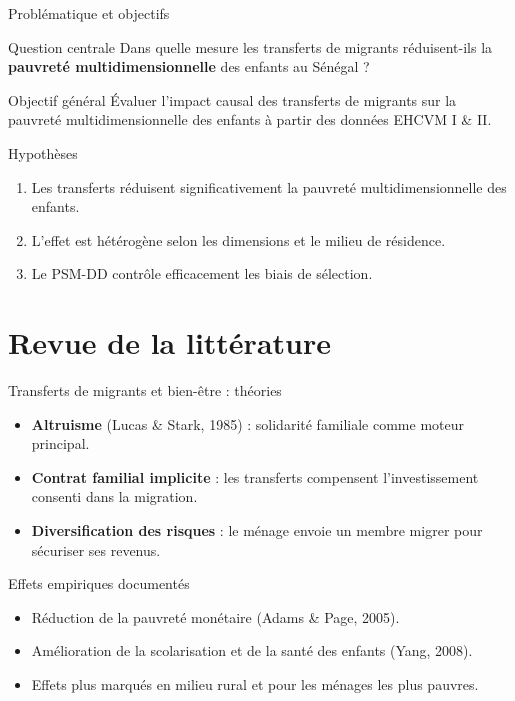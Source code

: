 \documentclass[10pt,aspectratio=169]{beamer}
\begin{document}
\begin{frame}{Problématique et objectifs}
  \begin{block}{Question centrale}
    Dans quelle mesure les transferts de migrants réduisent-ils
    la \textbf{pauvreté multidimensionnelle} des enfants au Sénégal ?
  \end{block}
  \pause
  \begin{block}{Objectif général}
    Évaluer l'impact causal des transferts de migrants sur la pauvreté
    multidimensionnelle des enfants à partir des données EHCVM I \& II.
  \end{block}
  \pause
  \begin{block}{Hypothèses}
    \begin{enumerate}
      \item[H1] Les transferts réduisent significativement la pauvreté multidimensionnelle des enfants.
      \item[H2] L'effet est hétérogène selon les dimensions et le milieu de résidence.
      \item[H3] Le PSM-DD contrôle efficacement les biais de sélection.
    \end{enumerate}
  \end{block}
\end{frame}

\section[Revue]{Revue de la littérature}

\begin{frame}{Transferts de migrants et bien-être : théories}
  \begin{itemize}
    \item \textbf{Altruisme} (Lucas \& Stark, 1985) : solidarité familiale comme moteur principal.
    \item \textbf{Contrat familial implicite} : les transferts compensent l'investissement consenti dans la migration.
    \item \textbf{Diversification des risques} : le ménage envoie un membre migrer pour sécuriser ses revenus.
  \end{itemize}
  \begin{block}{Effets empiriques documentés}
    \begin{itemize}
      \item Réduction de la pauvreté monétaire (Adams \& Page, 2005).
      \item Amélioration de la scolarisation et de la santé des enfants (Yang, 2008).
      \item Effets plus marqués en milieu rural et pour les ménages les plus pauvres.
    \end{itemize}
  \end{block}
\end{frame}
\end{document}
